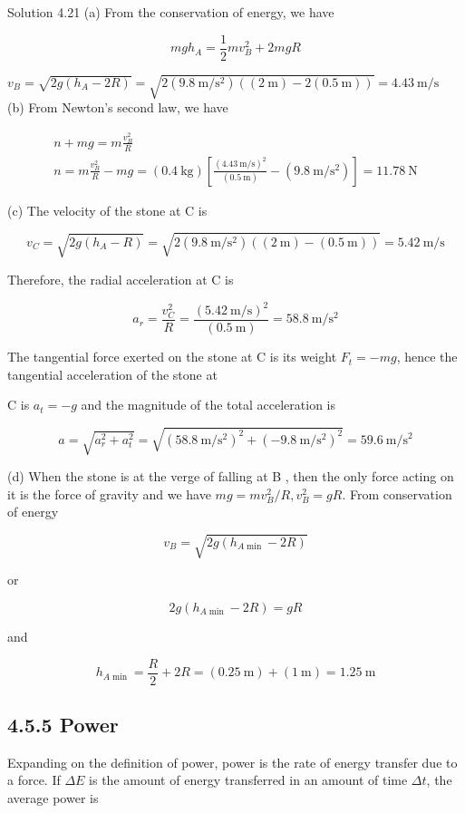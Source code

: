 \documentclass[10pt]{article}
\begin{document}
Solution 4.21 (a) From the conservation of energy, we have

$$
m g h_{A}=\frac{1}{2} m v_{B}^{2}+2 m g R
$$

$v_{B}=\sqrt{2 g\left(h_{A}-2 R\right)}=\sqrt{2\left(9.8 \mathrm{~m} / \mathrm{s}^{2}\right)((2 \mathrm{~m})-2(0.5 \mathrm{~m}))}=4.43 \mathrm{~m} / \mathrm{s}$\\
(b) From Newton's second law, we have

$$
\begin{gathered}
n+m g=m \frac{v_{B}^{2}}{R} \\
n=m \frac{v_{B}^{2}}{R}-m g=(0.4 \mathrm{~kg})\left[\frac{(4.43 \mathrm{~m} / \mathrm{s})^{2}}{(0.5 \mathrm{~m})}-\left(9.8 \mathrm{~m} / \mathrm{s}^{2}\right)\right]=11.78 \mathrm{~N}
\end{gathered}
$$

(c) The velocity of the stone at C is

$$
v_{C}=\sqrt{2 g\left(h_{A}-R\right)}=\sqrt{2\left(9.8 \mathrm{~m} / \mathrm{s}^{2}\right)((2 \mathrm{~m})-(0.5 \mathrm{~m}))}=5.42 \mathrm{~m} / \mathrm{s}
$$

Therefore, the radial acceleration at C is

$$
a_{r}=\frac{v_{C}^{2}}{R}=\frac{(5.42 \mathrm{~m} / \mathrm{s})^{2}}{(0.5 \mathrm{~m})}=58.8 \mathrm{~m} / \mathrm{s}^{2}
$$

The tangential force exerted on the stone at C is its weight $F_{t}=-m g$, hence the tangential acceleration of the stone at

C is $a_{t}=-g$ and the magnitude of the total acceleration is

$$
a=\sqrt{a_{r}^{2}+a_{t}^{2}}=\sqrt{\left(58.8 \mathrm{~m} / \mathrm{s}^{2}\right)^{2}+\left(-9.8 \mathrm{~m} / \mathrm{s}^{2}\right)^{2}}=59.6 \mathrm{~m} / \mathrm{s}^{2}
$$

(d) When the stone is at the verge of falling at B , then the only force acting on it is the force of gravity and we have $m g=m v_{B}^{2} / R, v_{B}^{2}=g R$. From conservation of energy

$$
v_{B}=\sqrt{2 g\left(h_{A \min }-2 R\right)}
$$

or

$$
2 g\left(h_{A \min }-2 R\right)=g R
$$

and

$$
h_{A \min }=\frac{R}{2}+2 R=(0.25 \mathrm{~m})+(1 \mathrm{~m})=1.25 \mathrm{~m}
$$

\subsection*{4.5.5 Power}
Expanding on the definition of power, power is the rate of energy transfer due to a force. If $\Delta E$ is the amount of energy transferred in an amount of time $\Delta t$, the average power is
\end{document}
